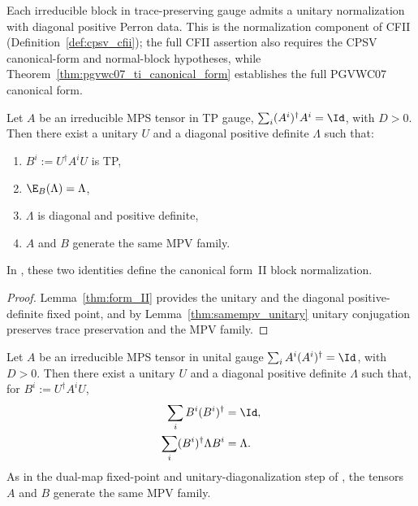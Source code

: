 Each irreducible block in trace-preserving gauge admits a unitary
normalization with diagonal positive Perron data. This is the normalization
component of CFII (Definition~\ref{def:cpsv_cfii}); the full CFII assertion also
requires the CPSV canonical-form and normal-block hypotheses, while
Theorem~\ref{thm:pgvwc07_ti_canonical_form} establishes the full PGVWC07
canonical form.

\begin{lemma}%
    \label{thm:CFII_data}
    \leanok
    Let $A$ be an irreducible MPS tensor in TP gauge,
    $\sum_i(A^i)^\dagger A^i=\Id$, with $D>0$. Then there exist a unitary
    $U$ and a diagonal positive definite $\Lambda$ such that:
    \begin{enumerate}
        \item $B^i:=U^\dagger A^iU$ is TP,
        \item $\E_B(\Lambda)=\Lambda$,
        \item $\Lambda$ is diagonal and positive definite,
        \item $A$ and $B$ generate the same MPV family.
    \end{enumerate}
    In \cite[Appendix~A]{Cirac2016MPDO_arXiv}, these two identities define the
    canonical form~II block normalization.
\end{lemma}

\begin{proof}\leanok
    Lemma~\ref{thm:form_II} provides the unitary and the diagonal
    positive-definite fixed point, and by Lemma~\ref{thm:samempv_unitary}
    unitary conjugation preserves trace preservation and the MPV family.
\end{proof}

\begin{lemma}%
    \label{thm:pgvwc07_dual_diag_unital}
    \leanok
    Let $A$ be an irreducible MPS tensor in unital gauge
    $\sum_iA^i(A^i)^\dagger=\Id$, with $D>0$. Then there exist a unitary $U$
    and a diagonal positive definite $\Lambda$ such that, for
    $B^i:=U^\dagger A^iU$,
    \begin{align}
        \sum_iB^i(B^i)^\dagger
         & =\Id,
        \notag       \\
        \sum_i(B^i)^\dagger\Lambda B^i
         & =\Lambda.
        \label{eq:canon_dual_diag_unital_pair}
    \end{align}
    As in the dual-map fixed-point and unitary-diagonalization step of
    \cite[Theorem~4]{PerezGarcia2007Matrix}, the tensors $A$ and $B$ generate
    the same MPV family.
\end{lemma}

